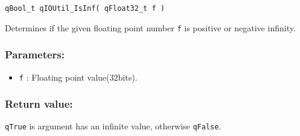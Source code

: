 \noindent\hrulefill

\begin{lstlisting}[style=CStyle]
qBool_t qIOUtil_IsInf( qFloat32_t f )
\end{lstlisting}

Determines if the given floating point number \lstinline{f} is positive or negative infinity. 

\subsubsection*{Parameters:}
\begin{itemize}
    \item \lstinline{f} : Floating point value(32bits).
\end{itemize}

\subsubsection*{Return value:}
\lstinline{qTrue} is argument has an infinite value, otherwise \lstinline{qFalse}.